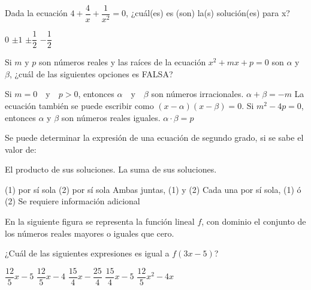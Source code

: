 \documentclass[borrador]{srs3}
\begin{document}
\begin{preguntas}
\pregunta Dada la ecuación \(4+\dfrac{4}{x}+\dfrac{1}{x^2} = 0\), ¿cuál(es) es (son) la(s) solución(es) para x?
\begin{alternativas}
\alternativa \(0\)
\alternativa \(\pm 1\)
\alternativa \(\pm \dfrac{1}{2}\)
\alternativa \(-\dfrac{1}{2}\)
\end{alternativas}

\pregunta Si \(m\) y \(p\) son números reales y las raíces de la ecuación \(x^2 + mx + p = 0\) son \(\alpha\) y \(\beta\), ¿cuál de las siguientes opciones es FALSA?
\begin{alternativas}
\alternativa Si \(m = 0\)~~y~~\(p > 0\), entonces \(\alpha\)~~y~~\(\beta\) son números irracionales.
\alternativa \(\alpha + \beta = -m\)
\alternativa La ecuación también se puede escribir como \((x-\alpha)(x-\beta) = 0\).
\alternativa Si \(m^2 - 4p = 0\), entonces \(\alpha\) y \(\beta\) son números reales iguales.
\alternativa \(\alpha \cdot \beta = p\)
\end{alternativas}

\pregunta Se puede determinar la expresión de una ecuación de segundo grado, si se sabe el valor de:
\begin{opciones*}
\opcion El producto de sus soluciones.
\opcion La suma de sus soluciones.
\end{opciones*}
\begin{alternativas}
\alternativa (1) por sí sola
\alternativa (2) por sí sola
\alternativa Ambas juntas, (1) y (2)
\alternativa Cada una por sí sola, (1) ó (2)
\alternativa Se requiere información adicional
\end{alternativas}

\pregunta En la siguiente figura se representa la función lineal \(f\), con dominio el conjunto de los números reales mayores o iguales que cero.
\begin{columnas}[0.6][t]
¿Cuál de las siguientes expresiones es igual a \(f\left(3x-5\right)\)?
\begin{alternativas}
\alternativa \(\dfrac{12}{5}x-5\)
\alternativa \(\dfrac{12}{5}x-4\)
\alternativa \(\dfrac{15}{4}x-\dfrac{25}{4}\)
\alternativa \(\dfrac{15}{4}x-5\)
\alternativa \(\dfrac{12}{5}x^2 - 4x\)
\end{alternativas}
\siguiente
{}
\end{columnas}


\end{preguntas}
\end{document}
